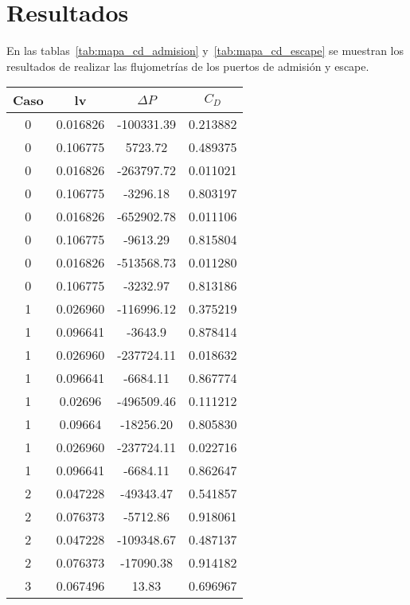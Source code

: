 \chapter{Resultados}

En las tablas~\ref{tab:mapa_cd_admision} y~\ref{tab:mapa_cd_escape} se muestran los
resultados de realizar las flujometrías de los puertos de admisión y escape.

\begin{table}
  \centering
    \begin{tabular}{cccc} \toprule
      Caso  & lv        & $\Delta P$    & $C_{D}$   \\ \midrule
      0     & 0.016826  & -100331.39    &  0.213882 \\
      0     & 0.106775  & 5723.72       &  0.489375 \\
      0     & 0.016826  & -263797.72    &  0.011021 \\
      0     & 0.106775  & -3296.18      &  0.803197 \\
      0     & 0.016826  & -652902.78    &  0.011106 \\
      0     & 0.106775  & -9613.29      &  0.815804 \\
      0     & 0.016826  & -513568.73    &  0.011280 \\
      0     & 0.106775  & -3232.97      &  0.813186 \\
      1     & 0.026960  & -116996.12    &  0.375219 \\
      1     & 0.096641  & -3643.9       &  0.878414 \\
      1     & 0.026960  & -237724.11    &  0.018632 \\
      1     & 0.096641  & -6684.11      &  0.867774 \\
      1     &  0.02696  & -496509.46    &  0.111212 \\
      1     &  0.09664  & -18256.20     &  0.805830 \\
      1     & 0.026960  & -237724.11    &  0.022716 \\
      1     & 0.096641  & -6684.11      &  0.862647 \\
      2     & 0.047228  & -49343.47     &  0.541857 \\
      2     & 0.076373  & -5712.86      &  0.918061 \\
      2     & 0.047228  & -109348.67    &  0.487137 \\
      2     & 0.076373  & -17090.38     &  0.914182 \\
      3     & 0.067496  & 13.83         &  0.696967 \\

\end{tabular}
\end{table}

